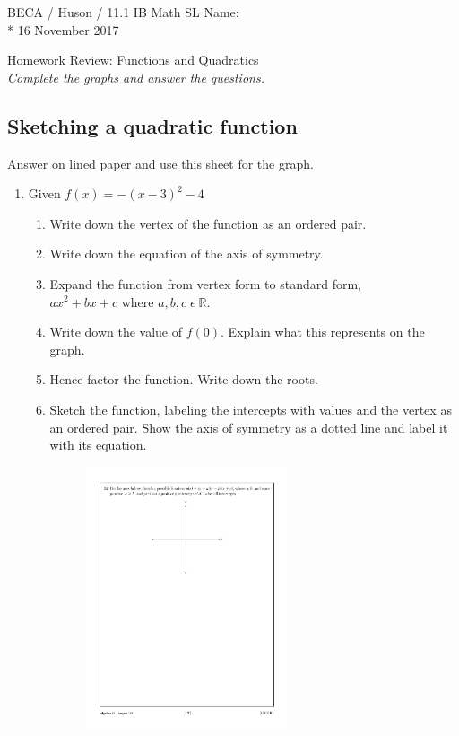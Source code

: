 \documentclass[]{book}
\begin{document}
\noindent BECA / Huson / 11.1 IB Math SL \hspace{2in} Name:\\*
16 November 2017
\begin{center}
{\Large Homework Review: Functions and Quadratics}\\
\textit{Complete the graphs and answer the questions.}
\end{center}

\subsection*{Sketching a quadratic function}
Answer on lined paper and use this sheet for the graph.

\begin{enumerate}


\item   Given $f(x)=-(x-3)^2-4$
\begin{enumerate}
    \item Write down the vertex of the function as an ordered pair.
    \item Write down the equation of the axis of symmetry.
    \item Expand the function from vertex form to standard form, $ax^2+bx+c \text{ where } a, b, c \;  \epsilon \; \mathbb{R}$.
    \item Write down the value of $f(0)$. Explain what this represents on the graph.
    \item Hence factor the function. Write down the roots.
    \item Sketch the function, labeling the intercepts with values and the vertex as an ordered pair. Show the axis of symmetry as a dotted line and label it with its equation.
\begin{figure}[!ht]
    \flushright
    \includegraphics[width=0.6\textwidth]{simple-axes.pdf}
\end{figure}


\end{enumerate}
\end{enumerate}
\end{document}
